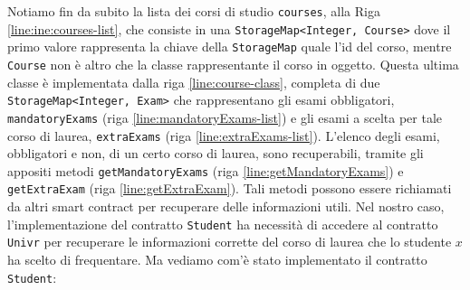 %
Notiamo fin da subito la lista dei corsi di studio \lstinline|courses|, alla Riga \ref{line:ine:courses-list}, che consiste in una \lstinline|StorageMap<Integer, Course>| dove il primo valore rappresenta la chiave della \lstinline|StorageMap| quale l'id del corso, mentre \lstinline|Course| non è altro che la classe rappresentante il corso in oggetto. Questa ultima classe è implementata dalla riga \ref{line:course-class}, completa di due \lstinline|StorageMap<Integer, Exam>| che rappresentano gli esami obbligatori, \lstinline|mandatoryExams| (riga \ref{line:mandatoryExams-list}) e gli esami a scelta per tale corso di laurea, \lstinline|extraExams| (riga \ref{line:extraExams-list}). L'elenco degli esami, obbligatori e non, di un certo corso di laurea, sono recuperabili, tramite gli appositi metodi \lstinline|getMandatoryExams| (riga \ref{line:getMandatoryExams}) e \lstinline|getExtraExam| (riga \ref{line:getExtraExam}). Tali metodi possono essere richiamati da altri smart contract per recuperare delle informazioni utili. Nel nostro caso, l'implementazione del contratto \lstinline|Student| ha necessità di accedere al contratto \lstinline|Univr| per recuperare le informazioni corrette del corso di laurea che lo studente $x$ ha scelto di frequentare. Ma vediamo com'è stato implementato il contratto \lstinline|Student|:
%
